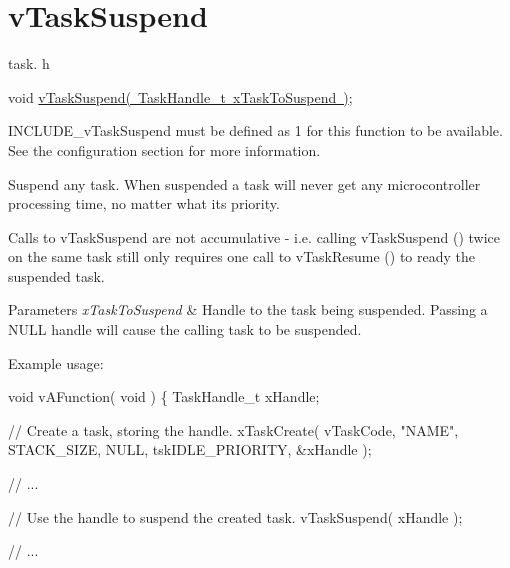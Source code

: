 \hypertarget{group__v_task_suspend}{}\section{v\+Task\+Suspend}
\label{group__v_task_suspend}
task. h 
\begin{DoxyPre}void \mbox{\hyperlink{task_8h_a84d4e660b04630be2939d91b3c2412f8}{vTaskSuspend( TaskHandle\_t xTaskToSuspend )}};\end{DoxyPre}


I\+N\+C\+L\+U\+D\+E\+\_\+v\+Task\+Suspend must be defined as 1 for this function to be available. See the configuration section for more information.

Suspend any task. When suspended a task will never get any microcontroller processing time, no matter what its priority.

Calls to v\+Task\+Suspend are not accumulative -\/ i.\+e. calling v\+Task\+Suspend () twice on the same task still only requires one call to v\+Task\+Resume () to ready the suspended task.


\begin{DoxyParams}{Parameters}
{\em x\+Task\+To\+Suspend} & Handle to the task being suspended. Passing a N\+U\+LL handle will cause the calling task to be suspended.\\
\hline
\end{DoxyParams}
Example usage\+: 
\begin{DoxyPre}
void vAFunction( void )
\{
TaskHandle\_t xHandle;\end{DoxyPre}



\begin{DoxyPre}    // Create a task, storing the handle.
    xTaskCreate( vTaskCode, "NAME", STACK\_SIZE, NULL, tskIDLE\_PRIORITY, \&xHandle );\end{DoxyPre}



\begin{DoxyPre}    // ...\end{DoxyPre}



\begin{DoxyPre}    // Use the handle to suspend the created task.
    vTaskSuspend( xHandle );\end{DoxyPre}



\begin{DoxyPre}    // ...\end{DoxyPre}



